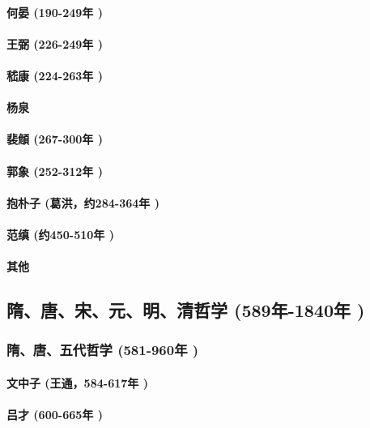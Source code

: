 \documentclass[UTF8]{../RepresentationUniverse}
\begin{document}
        \paragraph{何晏 (190-249年 )}
        \paragraph{王弼 (226-249年 )}
        \paragraph{嵇康 (224-263年 )}
        \paragraph{杨泉}
        \paragraph{裴頠 (267-300年 )}
        \paragraph{郭象 (252-312年 )}
        \paragraph{抱朴子 (葛洪，约284-364年 )}
        \paragraph{范缜 (约450-510年 )}
        \paragraph{其他}

\subsection{隋、唐、宋、元、明、清哲学 (589年-1840年 )}
    \subsubsection{隋、唐、五代哲学 (581-960年 )}
        \paragraph{文中子 (王通，584-617年 )}
        \paragraph{吕才 (600-665年 )}
\end{document}
